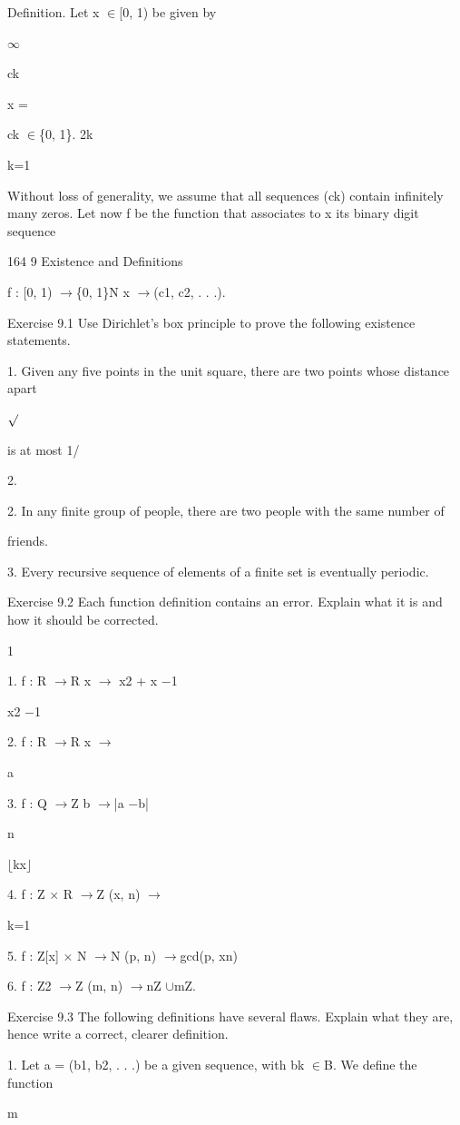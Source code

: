\documentclass[11pt]{article}
\theoremstyle{plain}
\theoremstyle{definition}
\begin{document}
Definition. Let x $\in$[0, 1) be given by

$\infty$

ck

x =

ck $\in$\{0, 1\}. 2k

k=1

Without loss of generality, we assume that all sequences (ck) contain infinitely many zeros. Let now f be the function that associates to x its binary digit sequence

164 9 Existence and Definitions

f : [0, 1) $\to$\{0, 1\}N x $\to$(c1, c2, . . .).

Exercise 9.1 Use Dirichlet's box principle to prove the following existence statements.

1. Given any five points in the unit square, there are two points whose distance apart

$\surd$

is at most 1/

2.

2. In any finite group of people, there are two people with the same number of

friends.

3. Every recursive sequence of elements of a finite set is eventually periodic.

Exercise 9.2 Each function definition contains an error. Explain what it is and how it should be corrected.

1

1. f : R $\to$R x $\to$ x2 + x $-$1

x2 $-$1

2. f : R $\to$R x $\to$

a

3. f : Q $\to$Z b $\to$|a $-$b|

n

$\lfloor$kx$\rfloor$

4. f : Z $\times$ R $\to$Z (x, n) $\to$

k=1

5. f : Z[x] $\times$ N $\to$N (p, n) $\to$gcd(p, xn)

6. f : Z2 $\to$Z (m, n) $\to$nZ $\cup$mZ.

Exercise 9.3 The following definitions have several flaws. Explain what they are, hence write a correct, clearer definition.

1. Let a = (b1, b2, . . .) be a given sequence, with bk $\in$B. We define the function

m
\end{document}

